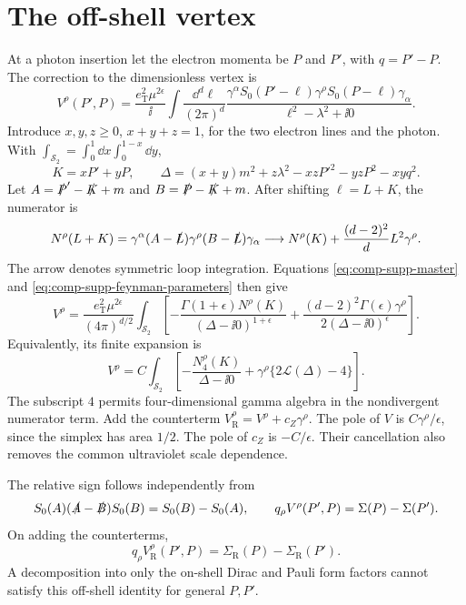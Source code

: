 \section{The off-shell vertex}
At a photon insertion let the electron momenta be $P$ and $P'$,
with $q=P'-P$. The correction to the dimensionless vertex is
\begin{equation}
 V^\rho(P',P)=\frac{e_{\mathrm T}^2\mu^{2\epsilon}}{\ii}
 \int\frac{\dd^d\ell}{(2\pi)^d}
 \frac{\gamma^\alpha S_0(P'-\ell)\gamma^\rho
                         S_0(P-\ell)\gamma_\alpha}
      {\ell^2-\lambda^2+\ii0}.
\end{equation}
Introduce $x,y,z\geq0$, $x+y+z=1$, for the two electron lines and
the photon. With $\int_{\mathcal S_2}=\int_0^1\dd x\int_0^{1-x}\dd y$,
\begin{equation}
 K=xP'+yP,\qquad
 \Delta=(x+y)m^2+z\lambda^2-xzP'^2-yzP^2-xyq^2.
\end{equation}
Let $A=\slashed P'-\slashed K+m$ and $B=\slashed P-\slashed K+m$.
After shifting $\ell=L+K$, the numerator is
\begin{equation}
 N^\rho(L+K)=\gamma^\alpha(A-\slashed L)\gamma^\rho
 (B-\slashed L)\gamma_\alpha
 \longrightarrow N^\rho(K)+\frac{(d-2)^2}{d}L^2\gamma^\rho.
\end{equation}
The arrow denotes symmetric loop integration. Equations
\eqref{eq:comp-supp-master} and \eqref{eq:comp-supp-feynman-parameters}
then give
\begin{equation}
 V^\rho=\frac{e_{\mathrm T}^2\mu^{2\epsilon}}{(4\pi)^{d/2}}
 \int_{\mathcal S_2}
 \left[-\frac{\Gamma(1+\epsilon)N^\rho(K)}{(\Delta-\ii0)^{1+\epsilon}}
 +\frac{(d-2)^2\Gamma(\epsilon)\gamma^\rho}
 {2(\Delta-\ii0)^\epsilon}\right].
\end{equation}
Equivalently, its finite expansion is
\begin{equation}
 V^\rho=C\int_{\mathcal S_2}
 \left[-\frac{N^\rho_4(K)}{\Delta-\ii0}
             +\gamma^\rho\{2\mathcal L(\Delta)-4\}\right].
 \label{eq:comp-supp-vertex-finite}
\end{equation}
The subscript $4$ permits four-dimensional gamma algebra in the
nondivergent numerator term. Add the counterterm
$V_{\mathrm R}^\rho=V^\rho+c_Z\gamma^\rho$.
The pole of $V$ is $C\gamma^\rho/\epsilon$, since the simplex has
area $1/2$. The pole of $c_Z$ is $-C/\epsilon$. Their cancellation
also removes the common ultraviolet scale dependence.

The relative sign follows independently from
\begin{equation}
 S_0(A)(\slashed A-\slashed B)S_0(B)=S_0(B)-S_0(A),
 \qquad q_\rho V^\rho(P',P)=\Sigma(P)-\Sigma(P').
\end{equation}
On adding the counterterms,
\begin{equation}
 q_\rho V_{\mathrm R}^\rho(P',P)
 =\Sigma_{\mathrm R}(P)-\Sigma_{\mathrm R}(P').
 \label{eq:comp-supp-ward}
\end{equation}
A decomposition into only the on-shell Dirac and Pauli form factors
cannot satisfy this off-shell identity for general $P,P'$.

